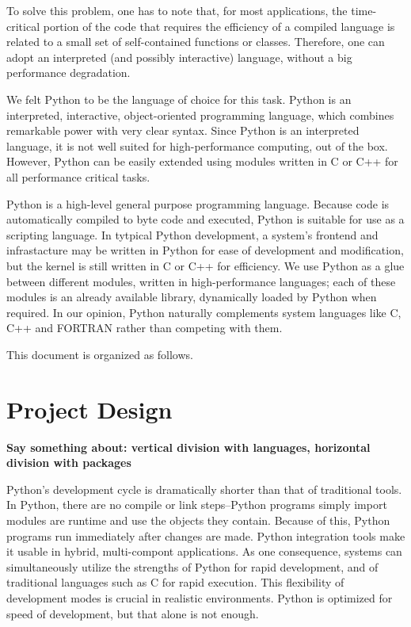 \documentclass[10pt,relax]{SANDreport}
\begin{document}
To solve this problem, one has to note that, for most
applications, the time-critical portion of the code that requires the
efficiency of a compiled language is related to a small set of
self-contained functions or classes. Therefore, one can adopt an interpreted
(and possibly interactive) language, without a big performance degradation.

We felt Python to be the language of choice for this task. Python is an
interpreted, interactive, object-oriented programming language, which combines
remarkable power with very clear syntax. Since Python is an interpreted
language, it is not well suited for high-performance computing, out of the
box. However, Python can be easily extended using modules written in C or C++
for all performance critical tasks.
\smallskip

Python is a high-level general purpose programming language. Because code is
automatically compiled to byte code and executed, Python is suitable for use
as a scripting language.  In tytpical Python development, a system's frontend
and infrastacture may be written in Python for ease of development and
modification, but the kernel is still written in C or C++ for efficiency.  We
use Python as a glue between different modules, written in high-performance
languages; each of these modules is an already available library, dynamically
loaded by Python when required.
In our opinion, Python naturally complements system
languages like C, C++ and FORTRAN rather than competing with them.

\smallskip

This document is organized as follows.

\section{Project Design}
\label{sec:design}

{\bf Say something about: vertical division with languages, horizontal
  division with packages}

  \bigskip

  Python's
  development cycle is dramatically shorter than that of traditional tools. In
  Python, there are no compile or link steps--Python programs simply import
  modules are runtime and use the objects they contain. Because of this,
Python programs run immediately after changes are made. Python integration
  tools make it usable in hybrid, multi-compont applications. As one
  consequence, systems can simultaneously utilize the strengths of Python for
  rapid development, and of traditional languages such as C for rapid
  execution.
  This flexibility of development modes is crucial in realistic environments.
  Python is optimized for speed of development, but that alone is not enough.
\end{document}
